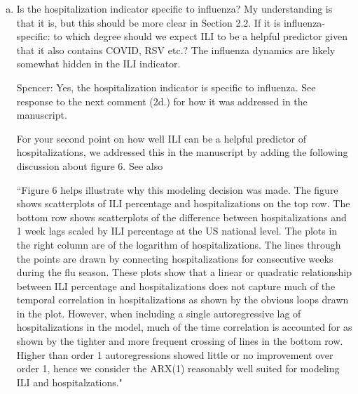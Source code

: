 \documentclass{article}
\newcommand{\spencer}[1]{{\color{blue} Spencer: #1}}
\begin{document}
\begin{enumerate}[1.]
\begin{enumerate}[a.]
\spencer{Practially, the reason to use the SIR model is generally because it is meant
to capture some of the scientific understanding of a disease outbreak. Again, we argue 
that the ASG is a reasonable alternative to SIR models in the case of the seasonal flu
outbreak. The ASG shape with a rise to a peak and a subsequent fall is similar in shape
to the regular ILI trajectory. It has also been used successfully in forecasting of 
other pheneomena with similar rises and falls (i.e. crop moisture)}.



\item Is the hospitalization indicator specific to influenza? My understanding is that it is, but this
should be more clear in Section 2.2. If it is influenza-specific: to which degree should we expect ILI
to be a helpful predictor given that it also contains COVID, RSV etc.? The influenza dynamics are
likely somewhat hidden in the ILI indicator.

\spencer{Yes, the hospitalization indicator is specific to influenza. See 
response to the next comment (2d.) for how it was addressed in the manuscript. 

For your second point on how well ILI can be a helpful predictor of hospitalizations,
we addressed this in the manuscript by adding the following discussion about
figure 6. See also 


``Figure 6 helps
illustrate why this modeling decision was made.
The figure shows scatterplots of ILI percentage and 
hospitalizations on the top row.
The bottom row shows scatterplots of the difference between hospitalizations and 
1 week lags scaled 
by ILI percentage at the US national level. The plots in the right column
are of the logarithm of hospitalizations. The lines through the points are
drawn by connecting hospitalizations for consecutive weeks during the flu 
season.
These plots show that a linear or quadratic relationship between ILI percentage 
and hospitalizations does not capture much of the temporal correlation in 
hospitalizations as shown by the obvious loops drawn in the plot. 
However, when including a 
single autoregressive lag of hospitalizations in the model, much of the time 
correlation is
accounted for as shown by the tighter and more frequent crossing of lines
in the bottom row. Higher than order 1 autoregressions showed little or no 
improvement over order 1, hence we consider the ARX(1) reasonably well 
suited for modeling ILI and hospitalzations."}





\end{enumerate}
\end{enumerate}
\end{document}
